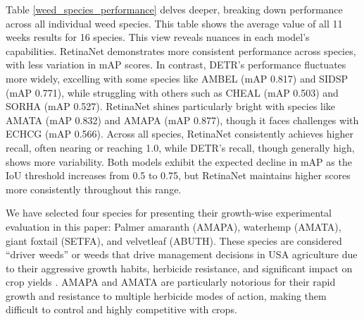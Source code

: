 Table \ref{weed_species_performance} delves deeper, breaking down performance across all individual weed species. This table shows the average value of all 11 weeks results for 16 species. This view reveals nuances in each model's capabilities. RetinaNet demonstrates more consistent performance across species, with less variation in mAP scores. In contrast, DETR's performance fluctuates more widely, excelling with some species like AMBEL (mAP 0.817) and SIDSP (mAP 0.771), while struggling with others such as CHEAL (mAP 0.503) and SORHA (mAP 0.527). RetinaNet shines particularly bright with species like AMATA (mAP 0.832) and AMAPA (mAP 0.877), though it faces challenges with ECHCG (mAP 0.566).
Across all species, RetinaNet consistently achieves higher recall, often nearing or reaching 1.0, while DETR's recall, though generally high, shows more variability. Both models exhibit the expected decline in mAP as the IoU threshold increases from 0.5 to 0.75, but RetinaNet maintains higher scores more consistently throughout this range.


We have selected four species for presenting their growth-wise experimental evaluation in this paper: Palmer amaranth (AMAPA), waterhemp (AMATA), giant foxtail (SETFA), and velvetleaf (ABUTH). These species are considered “driver weeds” or weeds that drive management decisions in USA agriculture due to their aggressive growth habits, herbicide resistance, and significant impact on crop yields \cite{illinois}. AMAPA and AMATA are particularly notorious for their rapid growth and resistance to multiple herbicide modes of action, making them difficult to control and highly competitive with crops.\\


